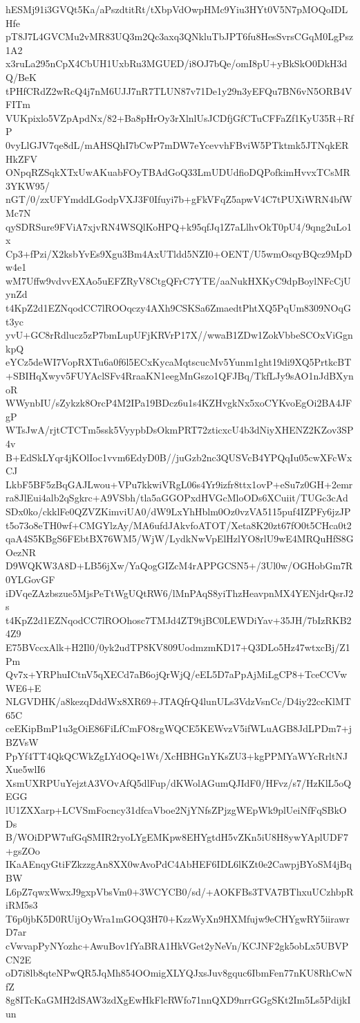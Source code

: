 hESMj91i3GVQt5Ka/aPszdtitRt/tXbpVdOwpHMc9Yiu3HYt0V5N7pMOQoIDLHfe
pT8J7L4GVCMu2vMR83UQ3m2Qc3axq3QNkluTbJPT6fu8HesSvrsCGqM0LgPsz1A2
x3ruLa295nCpX4CbUH1UxbRu3MGUED/i8OJ7bQe/omI8pU+yBkSkO0DkH3dQ/BeK
tPHfCRdZ2wRcQ4j7nM6UJJ7nR7TLUN87v71De1y29n3yEFQu7BN6vN5ORB4VFITm
VUKpixlo5VZpApdNx/82+Ba8pHrOy3rXlnlUsJCDfjGfCTuCFFaZf1KyU35R+RfP
0vyLlGJV7qe8dL/mAHSQhI7bCwP7mDW7eYcevvhFBviW5PTktmk5JTNqkERHkZFV
ONpqRZSqkXTxUwAKuabFOyTBAdGoQ33LmUDUdfioDQPofkimHvvxTCsMR3YKW95/
nGT/0/zxUFYmddLGodpVXJ3F0Ifuyi7b+gFkVFqZ5apwV4C7tPUXiWRN4bfWMc7N
qySDRSure9FViA7xjvRN4WSQlKoHPQ+k95qfJq1Z7aLlhvOkT0pU4/9qng2uLo1x
Cp3+fPzi/X2ksbYvEs9Xgu3Bm4AxUTldd5NZI0+OENT/U5wmOsqyBQcz9MpDw4e1
wM7Uffw9vdvvEXAo5uEFZRyV8CtgQFrC7YTE/aaNukHXKyC9dpBoylNFcCjUynZd
t4KpZ2d1EZNqodCC7lROOqczy4AXh9CSKSa6ZmaedtPhtXQ5PqUm8309NOqGt3yc
yvU+GC8rRdlucz5zP7bmLupUFjKRVrP17X//wwaB1ZDw1ZokVbbeSCOxViGgnkpQ
eYCz5deWI7VopRXTu6a0f6l5ECxKycaMqtscucMv5Yunm1ght19di9XQ5PrtkcBT
+SBIHqXwyv5FUYAclSFv4RraaKN1eegMnGszo1QFJBq/TkfLJy9sAO1nJdBXynoR
WWynbIU/sZykzk8OrcP4M2IPa19BDcz6u1s4KZHvgkNx5xoCYKvoEgOi2BA4JFgP
WTsJwA/rjtCTCTm5ssk5VyypbDsOkmPRT72zticxcU4b3dNiyXHENZ2KZov3SP4v
B+EdSkLYqr4jKOlIoc1vvm6EdyD0B//juGzb2nc3QUSVcB4YPQqIu05cwXFcWxCJ
LkbF5BF5zBqGAJLwou+VPu7kkwiVRgL06s4Yr9izfr8ttx1ovP+eSu7z0GH+2emr
ra8JlEui4alb2qSgkrc+A9VSbh/tla5aGGOPxdHVGcMloODs6XCuiit/TUGc3cAd
SDx0ko/ckklFe0QZVZKimviUA0/dW9LxYhHblm0Oz0vzVA5115puf4IZPFy6jzJP
t5o73o8eTH0wf+CMGYlzAy/MA6ufdJAkvfoATOT/Xeta8K20zt67fO0t5CHca0t2
qaA4S5KBgS6FEbtBX76WM5/WjW/LydkNwVpElHzlYO8rlU9wE4MRQuHfS8GOezNR
D9WQKW3A8D+LB56jXw/YaQogGIZcM4rAPPGCSN5+/3Ul0w/OGHobGm7R0YLGovGF
iDVqeZAzbszue5MjsPeTtWgUQtRW6/lMnPAqS8yiThzHeavpnMX4YENjdrQsrJ2s
t4KpZ2d1EZNqodCC7lROOhosc7TMJd4ZT9tjBC0LEWDiYav+35JH/7bIzRKB24Z9
E75BVccxAlk+H2Il0/0yk2udTP8KV809UodmzmKD17+Q3DLo5Hz47wtxcBj/Z1Pm
Qv7x+YRPhuICtnV5qXECd7aB6ojQrWjQ/eEL5D7aPpAjMiLgCP8+TceCCVwWE6+E
NLGVDHK/a8kezqDddWx8XR69+JTAQfrQ4lunULs3VdzVsnCc/D4iy22ccKlMT65C
ceEKipBmP1u3gOiE86FiLfCmFO8rgWQCE5KEWvzV5ifWLuAGB8JdLPDm7+jBZVsW
PpYf4TT4QkQCWkZgLYdOQe1Wt/XcHBHGnYKsZU3+kgPPMYaWYcRrltNJXue5wlI6
XsmUXRPUuYejztA3VOvAfQ5dlFup/dKWolAGumQJIdF0/HFvz/s7/HzKlL5oQEGG
lU1ZXXarp+LCVSmFocncy31dfcaVboe2NjYNfsZPjzgWEpWk9plUeiNfFqSBkODs
B/WOiDPW7ufGqSMIR2ryoLYgEMKpw8EHYgtdH5vZKn5iU8H8ywYAplUDF7+gsZOo
IKaAEnqyGtiFZkzzgAn8XX0wAvoPdC4AbHEF6IDL6lKZt0e2CawpjBYoSM4jBqBW
L6pZ7qwxWwxJ9gxpVbsVm0+3WCYCB0/sd/+AOKFBs3TVA7BThxuUCzhbpRiRM5s3
T6p0jbK5D0RUijOyWra1mGOQ3H70+KzzWyXn9HXMfujw9eCHYgwRY5iirawrD7ar
cVwvapPyNYozhc+AwuBov1fYaBRA1HkVGet2yNeVn/KCJNF2gk5obLx5UBVPCN2E
oD7i8lb8qteNPwQR5JqMh854OOmigXLYQJxsJuv8gquc6IbmFen77nKU8RhCwNfZ
8g8ITcKaGMH2dSAW3zdXgEwHkFlcRWfo71nnQXD9nrrGGgSKt2Im5Ls5PdijkIun
